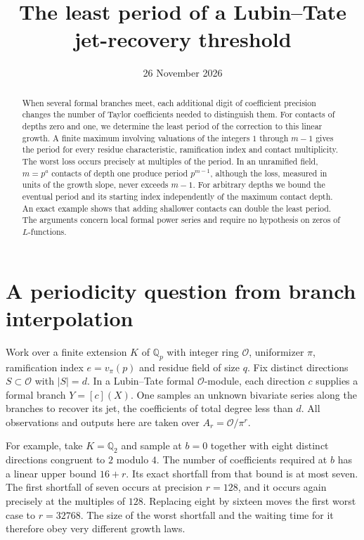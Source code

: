 \documentclass[11pt,letterpaper]{article}
\title{The least period of a Lubin--Tate\texorpdfstring{\\}{ } jet-recovery threshold}
\author{}
\date{26 November 2026}
\newcommand{\OO}{\mathcal O}
\newcommand{\QQ}{\mathbb Q}
\begin{document}
\maketitle
\vspace{-1.5em}
\begin{abstract}
When several formal branches meet, each additional digit of coefficient precision changes the number of Taylor coefficients needed to distinguish them. For contacts of depths zero and one, we determine the least period of the correction to this linear growth. A finite maximum involving valuations of the integers $1$ through $m-1$ gives the period for every residue characteristic, ramification index and contact multiplicity. The worst loss occurs precisely at multiples of the period. In an unramified field, $m=p^a$ contacts of depth one produce period $p^{m-1}$, although the loss, measured in units of the growth slope, never exceeds $m-1$. For arbitrary depths we bound the eventual period and its starting index independently of the maximum contact depth. An exact example shows that adding shallower contacts can double the least period. The arguments concern local formal power series and require no hypothesis on zeros of $L$-functions.
\end{abstract}

\section{A periodicity question from branch interpolation}
Work over a finite extension $K$ of $\QQ_p$ with integer ring $\OO$, uniformizer $\pi$, ramification index $e=v_\pi(p)$ and residue field of size $q$. Fix distinct directions $S\subset\OO$ with $|S|=d$. In a Lubin--Tate formal $\OO$-module, each direction $c$ supplies a formal branch $Y=[c](X)$. One samples an unknown bivariate series along the branches to recover its jet, the coefficients of total degree less than $d$. All observations and outputs here are taken over $A_r=\OO/\pi^r$.

For example, take $K=\QQ_2$ and sample at $b=0$ together with eight distinct directions congruent to $2$ modulo $4$. The number of coefficients required at $b$ has a linear upper bound $16+r$. Its exact shortfall from that bound is at most seven. The first shortfall of seven occurs at precision $r=128$, and it occurs again precisely at the multiples of $128$. Replacing eight by sixteen moves the first worst case to $r=32768$. The size of the worst shortfall and the waiting time for it therefore obey very different growth laws.
\end{document}
